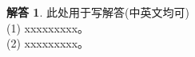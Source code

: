 \documentclass[a4paper,UTF8]{article}
\numberwithin{equation}{section}
\theoremstyle{definition}
\newtheorem*{solution}{解答}
\newtheorem*{prove}{Proof}
\begin{document}
\begin{solution}
此处用于写解答(中英文均可)\\
(1) xxxxxxxxx。\\
(2) xxxxxxxxx。\\
\end{solution}


\end{document}
